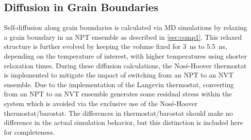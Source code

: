 \documentclass[review]{elsarticle}
\begin{document}
\subsection{Diffusion in Grain Boundaries}\label{sec:comp2}
\par Self-diffusion along grain boundaries is calculated via MD simulations 
by relaxing a grain boundary in an NPT ensemble as described in \cref{sec:comp1}. This relaxed structure is further evolved by keeping the volume fixed for 3~ns to 5.5~ns, depending on the temperature of interest, with higher temperatures using shorter relaxation times. During these diffusion calculations, the Nos\'{e}-Hoover thermostat is implemented to mitigate the impact of switching from an NPT to an NVT ensemble. Due to the implementation of the Langevin thermostat, converting from an NPT to an NVT ensemble generates some residual stress within the system which is avoided via the exclusive use of the Nos\'{e}-Hoover thermostat/barostat. The differences in thermostat/barostat should make no difference in the actual simulation behavior, but this distinction is included here for completeness. 
\end{document}
